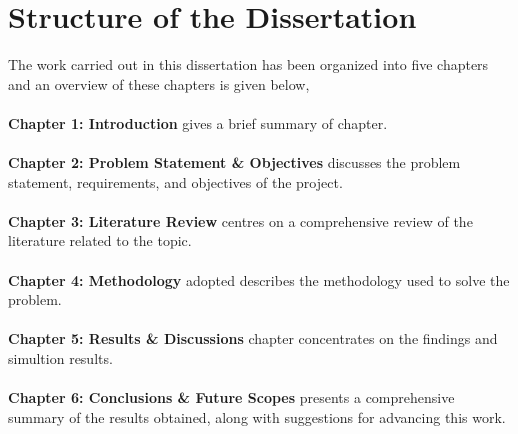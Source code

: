 \section{Structure of the Dissertation}
The work carried out in this dissertation has been organized into five chapters and an overview of these chapters is given below,\\\\
\textbf{Chapter 1: Introduction} gives a brief summary of chapter. \\\\
\textbf{Chapter 2: Problem Statement \& Objectives} discusses the problem statement, requirements, and objectives of the project.\\\\
\textbf{Chapter 3: Literature Review} centres on a comprehensive review of the literature related to the topic.\\\\
\textbf{Chapter 4: Methodology} adopted describes the methodology used to solve the problem.\\\\
\textbf{Chapter 5: Results \& Discussions} chapter concentrates on the findings and simultion results. \\\\
\textbf{Chapter 6: Conclusions \& Future Scopes} presents a comprehensive summary of the results obtained, along with suggestions for advancing this work.

